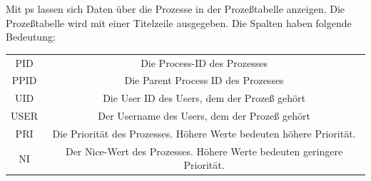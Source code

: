 \documentclass[a4paper]{article}
\begin{document}
Mit ps lassen sich Daten über die Prozesse in der Prozeßtabelle anzeigen. Die Prozeßtabelle wird mit einer Titelzeile ausgegeben. Die Spalten haben folgende Bedeutung:
\begin{tabular}{c|c}
    PID     & Die Process-ID des Prozesses                                                                                                                                                                                                                                                                                                                                               \\
    PPID    & Die Parent Process ID des Prozesses                                                                                                                                                                                                                                                                                                                                        \\
    UID     & Die User ID des Users, dem der Prozeß gehört                                                                                                                                                                                                                                                                                                                               \\
    USER    & Der Username des Users, dem der Prozeß gehört                                                                                                                                                                                                                                                                                                                              \\
    PRI     & Die Priorität des Prozesses. Höhere Werte bedeuten höhere Priorität.                                                                                                                                                                                                                                                                                                       \\
    NI      & Der Nice-Wert des Prozesses. Höhere Werte bedeuten geringere Priorität.                                                                                                                                                                                                                                                                                                    \\

\end{tabular}
\end{document}
